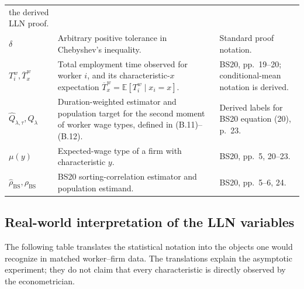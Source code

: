 \documentclass[11pt]{article}
\begin{document}
\begin{longtable}{p{}p{}p{}}
the derived LLN proof. \\
\(\delta\) & Arbitrary positive tolerance in Chebyshev's inequality. &
Standard proof notation. \\
\(T_i^w,\overline T_x^w\) & Total employment time observed for worker \(i\),
and its characteristic-\(x\) expectation
\(\overline T_x^w=\mathbb E[T_i^w\mid x_i=x]\). & BS20, pp.\ 19--20;
conditional-mean notation is derived. \\
\(\widehat Q_{\lambda,\tau},Q_\lambda\) & Duration-weighted estimator and
population target for the second moment of worker wage types, defined in
(B.11)--(B.12). & Derived labels for BS20 equation (20), p.\ 23. \\
\(\mu(y)\) & Expected-wage type of a firm with characteristic \(y\). &
BS20, pp.\ 5, 20--23. \\
\(\widehat\rho_{\mathrm{BS}},\rho_{\mathrm{BS}}\) & BS20 sorting-correlation
estimator and population estimand. & BS20, pp.\ 5--6, 24. \\
\end{longtable}

\subsection{Real-world interpretation of the LLN variables}

The following table translates the statistical notation into the objects one
would recognize in matched worker--firm data.  The translations explain the
asymptotic experiment; they do not claim that every characteristic is
directly observed by the econometrician.
\end{document}
